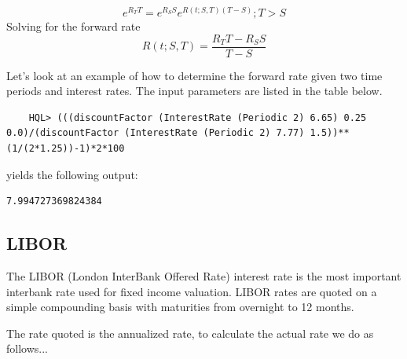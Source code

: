 \documentclass[11pt,a4paper]{article}
\numberwithin{equation}{section}
\begin{document}
	\[
	e^{R_TT}=e^{R_SS}e^{R(t;S,T)(T-S)};T>S
	\]
	Solving for the forward rate
	\[
	R(t;S,T)=\frac{R_TT-R_SS}{T-S}
	\]

	Let's look at an example of how to determine the forward rate given two time periods and interest rates. The input parameters are listed in the table below.


	\FrameSep
	\begin{lstlisting}
	HQL> (((discountFactor (InterestRate (Periodic 2) 6.65) 0.25 0.0)/(discountFactor (InterestRate (Periodic 2) 7.77) 1.5))**(1/(2*1.25))-1)*2*100
	\end{lstlisting}
	yields the following output:
	\FrameSep
	\begin{lstlisting}[style=Output]
	7.994727369824384
	\end{lstlisting}

	\subsection{LIBOR}
	The LIBOR (London InterBank Offered Rate) interest rate is the most important interbank rate
	used for fixed income valuation. LIBOR rates are quoted on a simple compounding basis with maturities
	from overnight to 12 months.

	The rate quoted is the annualized rate, to calculate the actual rate we do as follows...

	\begin{minipage}{\linewidth}
	\label{fig:comp01}
	\end{minipage}
\end{document}
